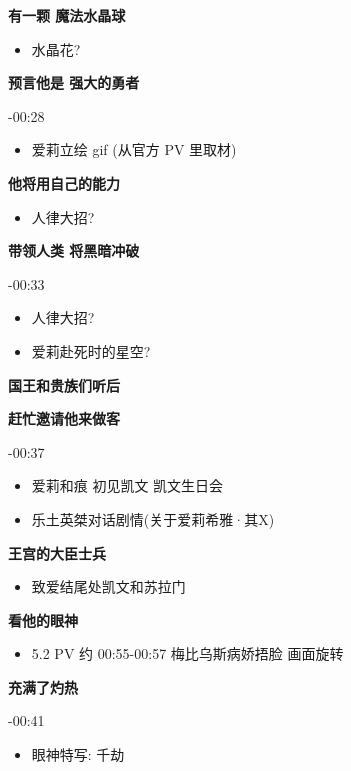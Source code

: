 \documentclass[a4paper]{article}
\begin{document}
\textbf{有一颗 魔法水晶球}

\begin{itemize}
    \item 水晶花?
\end{itemize}

\textbf{预言他是 强大的勇者}

-00:28

\begin{itemize}
    \item 爱莉立绘 gif (从官方 PV 里取材)
\end{itemize}

\textbf{他将用自己的能力}

\begin{itemize}
    \item 人律大招?
\end{itemize}

\textbf{带领人类 将黑暗冲破}

-00:33

\begin{itemize}
    \item 人律大招?
    \item 爱莉赴死时的星空?
\end{itemize}

\textbf{国王和贵族们听后}

\textbf{赶忙邀请他来做客}

-00:37

\begin{itemize}
    \item 爱莉和痕 初见凯文 凯文生日会
    \item 乐土英桀对话剧情(关于爱莉希雅·其X)
\end{itemize}

\textbf{王宫的大臣士兵}

\begin{itemize}
    \item 致爱结尾处凯文和苏拉门
\end{itemize}

\textbf{看他的眼神}

\begin{itemize}
    \item 5.2 PV 约 00:55-00:57 梅比乌斯病娇捂脸 画面旋转
\end{itemize}

\textbf{充满了灼热}

-00:41

\begin{itemize}
    \item 眼神特写: 千劫
\end{itemize}
\end{document}
